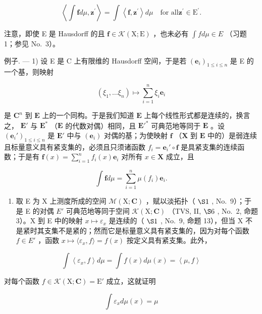 \[
\left\langle \int \mathbf {f} d \mu , \mathbf {z} ^ {\prime} \right\rangle = \int \left\langle \mathbf {f}, \mathbf {z} ^ {\prime} \right\rangle d \mu \quad \text {for all} \mathbf {z} ^ {\prime} \in \mathrm{E} ^ {\prime}.\tag{1}
\]

注意，即使 E 是 Hausdorff 的且 \(\mathbf{f} \in \mathcal{K}(\mathrm{X};\mathrm{E})\) ，也未必有 \(\int f d\mu \in E\) （习题 1；参见 No.~3）。

例子. --- 1) 设 E 是 C 上有限维的 Hausdorff 空间，于是若 \((\mathbf{e}_{i})_{1\leqslant i\leqslant n}\) 是 E 的一个基，则映射

\[
\left(\xi_ {1}, \dots \xi_ {n}\right) \mapsto \sum_ {i = 1} ^ {n} \xi_ {i} \mathbf {e} _ {i}
\]

是 \(\mathbf{C}^n\) 到 \(\mathbf{E}\) 上的一个同构。于是我们知道 \(\mathbf{E}\) 上每个线性形式都是连续的，换言之， \(\mathbf{E}'\) 与 \(\mathbf{E}^*\) （\(\mathbf{E}\) 的代数对偶）相同，且 \(\mathbf{E}'^*\) 可典范地等同于 \(\mathbf{E}\) 。设 \((\mathbf{e}_i')_{1 \leqslant i \leqslant n}\) 是 \(\mathbf{E}'\) 中与 \((\mathbf{e}_i)\) 对偶的基；为使映射 \(\mathbf{f}\) （\(\mathbf{X}\) 到 \(\mathbf{E}\) 中的）是弱连续且标量意义具有紧支集的，必须且只须诸函数 \(f_i = \mathbf{e}_i' \circ \mathbf{f}\) 是具紧支集的连续函数；于是有 \(\mathbf{f}(x) = \sum_{i=1}^{n} f_i(x) \mathbf{e}_i\) 对所有 \(x \in \mathbf{X}\) 成立，且

\[
\int \mathbf {f} d \mu = \sum_ {i = 1} ^ {n} \mu (f _ {i}) \mathbf {e} _ {i}.
\]

\begin{enumerate}
\def\labelenumi{\arabic{enumi})}
\setcounter{enumi}{1}
\tightlist
\item
  取 E 为 X 上测度所成的空间 \(\mathcal{M}(\mathrm{X};\mathbf{C})\) ，赋以淡拓扑（ \(\S1\) , No.~9）；于是 E 的对偶 \(E'\) 可典范地等同于空间 \(\mathcal{K}(\mathrm{X};\mathbf{C})\) （TVS, II, \(\S6\) , No.~2, 命题 3）。X 到 E 中的映射 \(x \mapsto \varepsilon_{x}\) 是连续的（ \(\S1\) , No.~9, 命题 13），但当 X 不是紧时其支集不是紧的；然而它是标量意义具有紧支集的，因为对每个函数 \(f \in E'\) ，函数 \(x \mapsto \langle \varepsilon_x, f \rangle = f(x)\) 按定义具有紧支集。此外，
\end{enumerate}

\[
\int \left\langle \varepsilon_ {x}, f \right\rangle d \mu = \int f (x) d \mu (x) = \left\langle \mu , f \right\rangle
\]

对每个函数 \(f \in \mathcal{K}(\mathrm{X};\mathbf{C}) = \mathrm{E}'\) 成立，这就证明

\[
\int \varepsilon_ {x} d \mu (x) = \mu
\]

